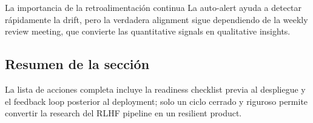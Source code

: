 \begin{importantbox}{La importancia de la retroalimentación continua}
La auto-alert ayuda a detectar rápidamente la drift, pero la verdadera alignment sigue dependiendo de la weekly review meeting, que convierte las quantitative signals en qualitative insights.
\end{importantbox}

\subsection{Resumen de la sección}

La lista de acciones completa incluye la readiness checklist previa al despliegue y el feedback loop posterior al deployment; solo un ciclo cerrado y riguroso permite convertir la research del RLHF pipeline en un resilient product.

